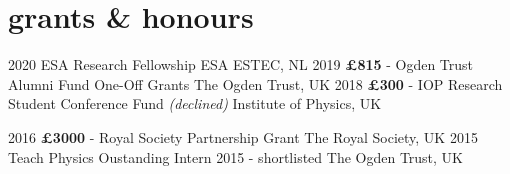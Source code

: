 \documentclass[letterpaper]{k-cv} %
\begin{document}
\section{\color{c1}grants \& honours}

\begin{entrylist}
	\centrythree
	{2020 }
	{ESA Research Fellowship}
	{ESA ESTEC, NL}
	\centrythree
	{2019}
	{\textbf{\textcolor{c1}{\pounds 815}} - Ogden Trust Alumni Fund One-Off Grants}
	{The Ogden Trust, UK}
	\centrythree
	{2018}
	{\textbf{\textcolor{c1}{\pounds 300}} - IOP Research Student Conference Fund \emph{(declined)}}
	{Institute of Physics, UK}
	
	\centrythree
	{2016}
	{\textbf{\textcolor{c1}{\pounds 3000}} - Royal Society Partnership Grant}
	{The Royal Society, UK}
	\centrythree
	{2015}
	{Teach Physics Oustanding Intern 2015 - shortlisted}
	{The Ogden Trust, UK}
	
\end{entrylist}





\clearpage



\end{document}
